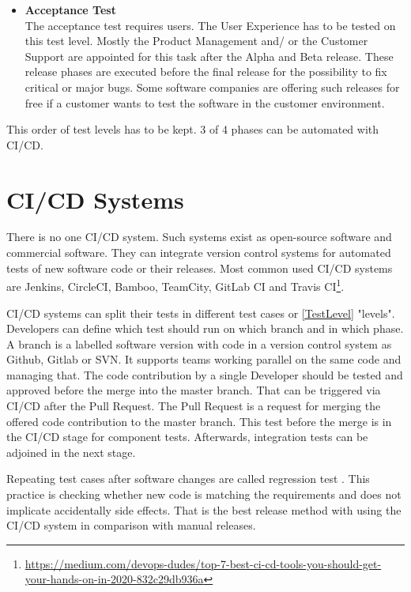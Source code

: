 \begin{itemize}
\item \textbf{Acceptance Test} \\
The acceptance test requires users. The User Experience has to be tested on this test level. Mostly the Product Management and/ or the Customer Support are appointed for this task after the Alpha and Beta release. These release phases are executed before the final release for the possibility to fix critical or major bugs.
Some software companies are offering such releases for free if a customer wants to test the software in the customer environment.
\end{itemize}
This order of test levels has to be kept. 3 of 4 phases can be automated with \gls{CI/CD}. 

\section{CI/CD Systems} \label{CI-CD}

There is no one \gls{CI/CD} system. Such systems exist as open-source software and commercial software. They can integrate version control systems for automated tests of new software code or their releases. Most common used \gls{CI/CD} systems are Jenkins, CircleCI, Bamboo, TeamCity, GitLab CI and Travis CI\footnote{\url{https://medium.com/devops-dudes/top-7-best-ci-cd-tools-you-should-get-your-hands-on-in-2020-832c29db936a}}.

\gls{CI/CD} systems can split their tests in different test cases or \ref{TestLevel} "levels". Developers can define which test should run on which branch and in which phase. A branch is a labelled software version with code in a version control system as Github, Gitlab or SVN. It supports teams working parallel on the same code and managing that. The code contribution by a single Developer should be tested and approved before the merge into the master branch. That can be triggered via \gls{CI/CD} after the Pull Request. The Pull Request is a request for merging the offered code contribution to the master branch. This test before the merge is in the \gls{CI/CD} stage for component tests. Afterwards, integration tests can be adjoined in the next stage.

Repeating test cases after software changes are called regression test \cite[~p.98]{Spillner2019}. This practice is checking whether new code is matching the requirements and does not implicate accidentally side effects. That is the best release method with using the \gls{CI/CD} system in comparison with manual releases.

